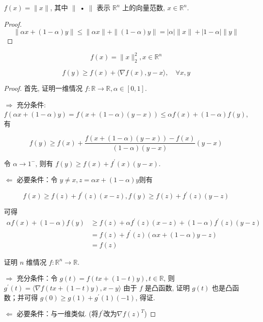 \begin{example}
    \label{Example:NormIsConvex}
    $ f(x)=\|x\| $, 其中 $ \| $ • $ \| $ 表示 $ \mathbb{R}^{n} $ 上的向量范数, $ x \in \mathbb{R}^{n} $.
\end{example}

\begin{proof}
    \label{Example:L2NormIsConvex}
    $$ \|\alpha x+(1-\alpha) y\| \leq\|\alpha x\|+\|(1-\alpha) y\|=|\alpha|\|x\|+|1-\alpha|\|y\| $$
\end{proof}

\begin{example}
    $$ f(x)=\|x\|_{2}^{2}, x \in \mathbb{R}^{n} $$
\end{example}

\begin{theorem}
    \label{Theorem:ConvexDiffential}
    $$ f(y) \geq f(x)+\langle\nabla f(x), y-x\rangle, \quad \forall x, y $$
\end{theorem}

\begin{proof}
    首先, 证明一维情况 $ f: \mathbb{R} \rightarrow \mathbb{R}, \alpha \in[0,1] $.

    $ \Rightarrow  $ 充分条件: $ f(\alpha x+(1-\alpha) y)=f(x+(1-\alpha)(y-x)) \leq \alpha f(x)+(1-\alpha) f(y) $,有

    $$ f(y) \geq f(x)+\frac{f(x+(1-\alpha)(y-x))-f(x)}{(1-\alpha)(y-x)}(y-x) $$

    令 $ \alpha \rightarrow 1^- $, 则有 $ f(y) \geq f(x)+f^{\prime}(x)(y-x) $.

    $ \Leftarrow  $ 必要条件：令 $ y \neq x, z=\alpha x+(1-\alpha) y$则有

    $$  f(x) \geq f(z)+f^{\prime}(z)(x-z), f(y) \geq f(z)+f^{\prime}(z)(y-z)  $$

    可得 
    $$\begin{aligned}
        \alpha f(x)+(1-\alpha) f(y) &\geq f(z)+\alpha f^{\prime}(z)(x-z)+(1-\alpha) f^{\prime}(z)(y-z) \\
        &=f(z)+f^{\prime}(z)(\alpha x+(1-\alpha) y-z) \\
        &=f(z)
    \end{aligned}
    $$

    证明 $ n $ 维情况 $ f: \mathbb{R}^{n} \rightarrow \mathbb{R} $.

    $ \Rightarrow $ 充分条件：令 $ g(t)=f(t x+(1-t) y), t \in \mathbb{R} $, 则 $ g^{\prime}(t)=\langle\nabla f(t x+(1-t) y), x-y\rangle $ 由于 $ f $ 是凸函数, 证明 $ g(t) $ 也是凸函数；并可得 $ g(0) \geq g(1)+g^{\prime}(1)(-1) $, 得证.

    $ \Leftarrow $ 必要条件：与一维类似. (将$f^{\prime}$改为$\nabla f(z)^T$) 
\end{proof}

